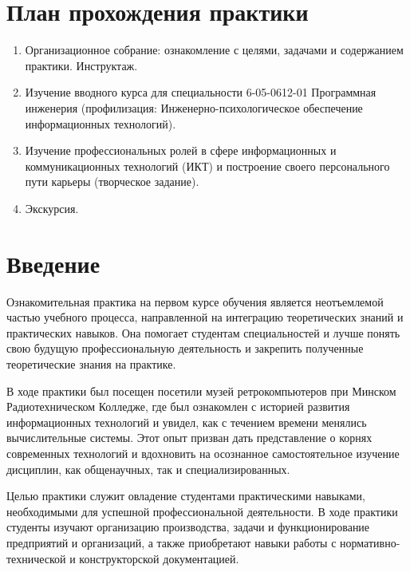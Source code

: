 \documentclass[variant=practice]{bsuir}
\begin{document}
\maketitle

\chapter*{План прохождения практики}

\begin{enumerate}
      \item Организационное собрание: ознакомление с целями, задачами и
            содержанием практики. Инструктаж.
      \item Изучение вводного курса  для
            специальности 6-05-0612-01 Программная инженерия (профилизация:
            Инженерно-психологическое обеспечение информационных технологий).
      \item Изучение профессиональных ролей в сфере информационных и
            коммуникационных технологий (ИКТ) и построение своего персонального
            пути карьеры (творческое задание).
      \item Экскурсия.
\end{enumerate}

\maketoc*

\chapter*{Введение}


Ознакомительная практика на первом курсе обучения является неотъемлемой частью
учебного процесса, направленной на интеграцию теоретических знаний и
практических навыков. Она помогает студентам специальностей
 и  лучше понять свою будущую профессиональную деятельность и закрепить
полученные теоретические знания на практике.

В ходе практики был посещен посетили музей ретрокомпьютеров
\textit{} при Минском Радиотехническом Колледже, где был
ознакомлен с историей развития информационных технологий и увидел, как с
течением времени менялись вычислительные системы. Этот опыт призван дать
представление о корнях современных технологий и вдохновить на осознанное
самостоятельное изучение дисциплин, как общенаучных, так и специализированных.

Целью практики служит овладение студентами практическими навыками, необходимыми
для успешной профессиональной деятельности. В ходе практики студенты изучают
организацию производства, задачи и функционирование предприятий и организаций, а
также приобретают навыки работы с нормативно-технической и конструкторской
документацией.
\end{document}

